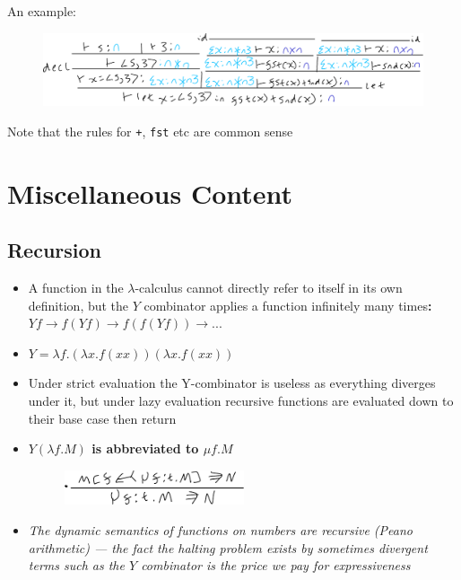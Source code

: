 \documentclass[20pt,a4paper,landscape]{extarticle}
\begin{document}
\begin{flushleft}
An example:
\FloatBarrier
\begin{figure}[h]
\begin{center}
\includegraphics[width=\textwidth]{meta/cs349/PCF_Typing_Example.pdf}{}
\end{center}
\end{figure}
\FloatBarrier
Note that the rules for \verb|+|, \verb|fst| etc are common sense
\clearpage
\section{Miscellaneous Content}
\subsection{Recursion}
\begin{itemize}
\item A function in the $\lambda$-calculus cannot directly refer to itself in its own definition, but the $Y$ combinator applies a function infinitely many times\textbf{: $Yf \rightarrow f(Yf) \rightarrow f(f(Yf)) \rightarrow ...$}
\item $Y = \lambda f. (\lambda x. f(xx))(\lambda x. f(xx))$
\item Under strict evaluation the Y-combinator is useless as everything diverges under it, but under lazy evaluation recursive functions are evaluated down to their base case then return
\item \textbf{$Y(\lambda f. M)$ is abbreviated to $\mu f. M$}
\FloatBarrier
\begin{figure}[h]
\includegraphics[width=0.5\textwidth]{meta/cs349/YComb_Natural.pdf}{}
\end{figure}
\FloatBarrier
\item \textit{The dynamic semantics of functions on numbers are recursive (Peano arithmetic) --- the fact the halting problem exists by sometimes divergent terms such as the $Y$ combinator is the price we pay for expressiveness}
\end{itemize}

\end{flushleft}
\end{document}
